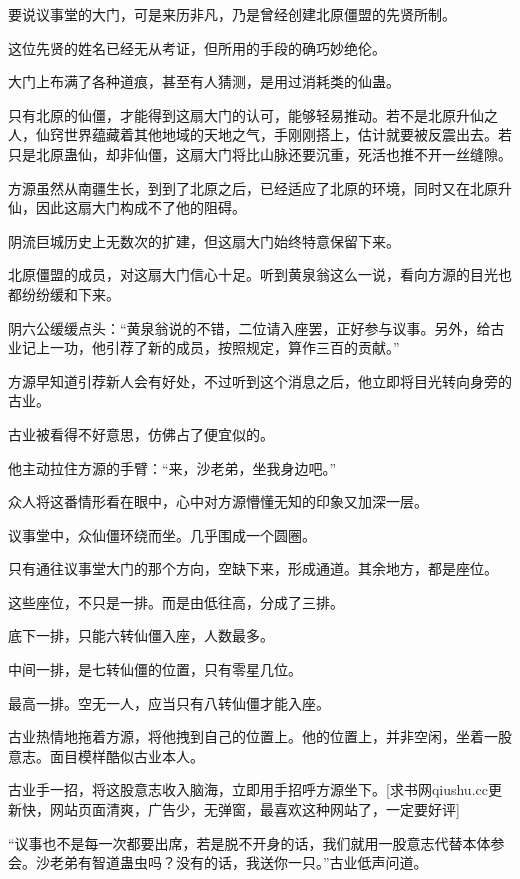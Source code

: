
\begin{this_body}

要说议事堂的大门，可是来历非凡，乃是曾经创建北原僵盟的先贤所制。

这位先贤的姓名已经无从考证，但所用的手段的确巧妙绝伦。

大门上布满了各种道痕，甚至有人猜测，是用过消耗类的仙蛊。

只有北原的仙僵，才能得到这扇大门的认可，能够轻易推动。若不是北原升仙之人，仙窍世界蕴藏着其他地域的天地之气，手刚刚搭上，估计就要被反震出去。若只是北原蛊仙，却非仙僵，这扇大门将比山脉还要沉重，死活也推不开一丝缝隙。

方源虽然从南疆生长，到到了北原之后，已经适应了北原的环境，同时又在北原升仙，因此这扇大门构成不了他的阻碍。

阴流巨城历史上无数次的扩建，但这扇大门始终特意保留下来。

北原僵盟的成员，对这扇大门信心十足。听到黄泉翁这么一说，看向方源的目光也都纷纷缓和下来。

阴六公缓缓点头：“黄泉翁说的不错，二位请入座罢，正好参与议事。另外，给古业记上一功，他引荐了新的成员，按照规定，算作三百的贡献。”

方源早知道引荐新人会有好处，不过听到这个消息之后，他立即将目光转向身旁的古业。

古业被看得不好意思，仿佛占了便宜似的。

他主动拉住方源的手臂：“来，沙老弟，坐我身边吧。”

众人将这番情形看在眼中，心中对方源懵懂无知的印象又加深一层。

议事堂中，众仙僵环绕而坐。几乎围成一个圆圈。

只有通往议事堂大门的那个方向，空缺下来，形成通道。其余地方，都是座位。

这些座位，不只是一排。而是由低往高，分成了三排。

底下一排，只能六转仙僵入座，人数最多。

中间一排，是七转仙僵的位置，只有零星几位。

最高一排。空无一人，应当只有八转仙僵才能入座。

古业热情地拖着方源，将他拽到自己的位置上。他的位置上，并非空闲，坐着一股意志。面目模样酷似古业本人。

古业手一招，将这股意志收入脑海，立即用手招呼方源坐下。[求书网qiushu.cc更新快，网站页面清爽，广告少，无弹窗，最喜欢这种网站了，一定要好评]

“议事也不是每一次都要出席，若是脱不开身的话，我们就用一股意志代替本体参会。沙老弟有智道蛊虫吗？没有的话，我送你一只。”古业低声问道。


\end{this_body}
